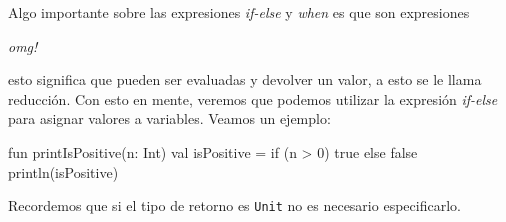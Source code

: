   Algo importante sobre las expresiones \textit{if-else} y \textit{when} es que son expresiones

  \begin{center}
    \textit{omg!}
  \end{center}

  esto significa que pueden ser evaluadas y devolver un valor, a esto se le llama reducción.
  Con esto en mente, veremos que podemos utilizar la expresión \textit{if-else} para asignar
  valores a variables.
  Veamos un ejemplo:

  \begin{kotlin}
    fun printIsPositive(n: Int) {
      val isPositive = if (n > 0) {
        true
      } else {
        false
      }
      println(isPositive)
    }
  \end{kotlin}

  Recordemos que si el tipo de retorno es \texttt{Unit} no es necesario especificarlo.
